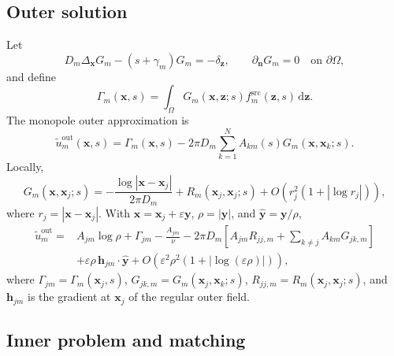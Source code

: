 \documentclass[pdflatex,sn-mathphys-num]{sn-jnl}
\numberwithin{equation}{section}
\theoremstyle{thmstyleone}%
\theoremstyle{definition}
\theoremstyle{remark}
\begin{document}
\begin{appendices}
\subsection{Outer solution}

Let
\begin{equation*}
D_m\Delta_{\mathbf x}G_m-(s+\gamma_m)G_m=-\delta_{\mathbf z},
\qquad \partial_{\mathbf n}G_m=0\quad\text{on }\partial\Omega,
\end{equation*}
and define
\begin{equation*}
\Gamma_m(\mathbf x,s)=\int_\Omega
G_m(\mathbf x,\mathbf z;s)f_m^{\mathrm{src}}(\mathbf z,s)
\,\mathrm d\mathbf z.
\end{equation*}
The monopole outer approximation is
\begin{equation*}
\widetilde u_m^{\mathrm{out}}(\mathbf x,s)
=\Gamma_m(\mathbf x,s)-2\pi D_m\sum_{k=1}^N
A_{km}(s)G_m(\mathbf x,\mathbf x_k;s).
\end{equation*}
Locally,
\begin{equation*}
G_m(\mathbf x,\mathbf x_j;s)
=-\frac{\log|\mathbf x-\mathbf x_j|}{2\pi D_m}
+R_m(\mathbf x_j,\mathbf x_j;s)
+O\!\left(r_j^2(1+|\log r_j|)\right),
\end{equation*}
where $r_j=|\mathbf x-\mathbf x_j|$. With
$\mathbf x=\mathbf x_j+\varepsilon\mathbf y$, $\rho=|\mathbf y|$, and
$\widehat{\mathbf y}=\mathbf y/\rho$,
\begin{align*}
\widetilde u_m^{\mathrm{out}}
={}&A_{jm}\log\rho+\Gamma_{jm}-\frac{A_{jm}}{\nu}
-2\pi D_m\left[A_{jm}R_{jj,m}
+\sum_{k\ne j}A_{km}G_{jk,m}\right] \nonumber\\
&+\varepsilon\rho\,\mathbf h_{jm}\cdot\widehat{\mathbf y}
+O\!\left(\varepsilon^2\rho^2
(1+|\log(\varepsilon\rho)|)\right),
\end{align*}
where $\Gamma_{jm}=\Gamma_m(\mathbf x_j,s)$,
$G_{jk,m}=G_m(\mathbf x_j,\mathbf x_k;s)$,
$R_{jj,m}=R_m(\mathbf x_j,\mathbf x_j;s)$,
and $\mathbf h_{jm}$ is the gradient at $\mathbf x_j$ of the regular outer
field.

\subsection{Inner problem and matching}


\end{appendices}
\end{document}
